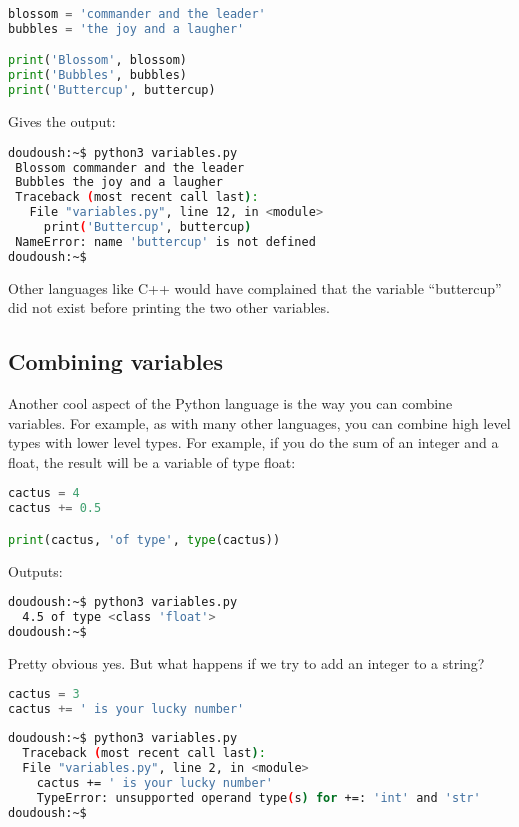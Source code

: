 \begin{lstlisting}[language=python]
blossom = 'commander and the leader'
bubbles = 'the joy and a laugher'

print('Blossom', blossom)
print('Bubbles', bubbles)
print('Buttercup', buttercup)
\end{lstlisting}

Gives the output:

\begin{lstlisting}[language=bash]
doudoush:~$ python3 variables.py
 Blossom commander and the leader
 Bubbles the joy and a laugher
 Traceback (most recent call last):
   File "variables.py", line 12, in <module>
     print('Buttercup', buttercup)
 NameError: name 'buttercup' is not defined
doudoush:~$
\end{lstlisting}

Other languages like C++ would have complained that the variable ``buttercup''
did not exist before printing the two other variables.

\subsection{Combining variables}

Another cool aspect of the Python language is the way you can combine variables.
For example, as with many other languages, you can combine high level types with
lower level types. For example, if you do the sum of an integer and a float,
the result will be a variable of type float:

\begin{lstlisting}[language=python]
cactus = 4
cactus += 0.5

print(cactus, 'of type', type(cactus))
\end{lstlisting}

Outputs:

\begin{lstlisting}[language=bash]
doudoush:~$ python3 variables.py
  4.5 of type <class 'float'>
doudoush:~$
\end{lstlisting}

Pretty obvious yes. But what happens if we try to add an integer to a string?

\begin{lstlisting}[language=python]
cactus = 3
cactus += ' is your lucky number'
\end{lstlisting}

\begin{lstlisting}[language=bash]
doudoush:~$ python3 variables.py
  Traceback (most recent call last):
  File "variables.py", line 2, in <module>
    cactus += ' is your lucky number'
    TypeError: unsupported operand type(s) for +=: 'int' and 'str'
doudoush:~$
\end{lstlisting}

